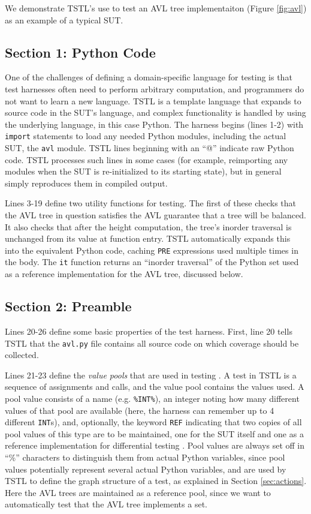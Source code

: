 \documentclass{sig-alternate}
\begin{document}
We demonstrate TSTL's use to test an AVL tree implementaiton (Figure \ref{fig:avl}) as an example of a typical SUT.


\subsection{Section 1: Python Code}

One of the challenges of defining a domain-specific language for
testing is that test harnesses often need to perform arbitrary
computation, and programmers do not want to learn a new language.
TSTL is a template language that expands to source code in the SUT's
language, and complex functionality is handled by using the underlying
language, in this case Python.  The harness begins (lines 1-2) with
{\tt import} statements to load any needed Python modules, including
the actual SUT, the {\tt avl} module.  TSTL lines beginning with an
``@'' indicate raw Python code.  TSTL processes such lines in some
cases (for example, reimporting any modules when the SUT is
re-initialized to its starting state), but in general simply
reproduces them in compiled output.  

Lines 3-19 define two utility functions for testing.  The first of
these checks that the AVL tree in question satisfies the AVL guarantee
that a tree will be balanced. It also checks that after the height
computation, the tree's inorder traversal is unchanged from its value
at function entry.  TSTL automatically expands this into the
equivalent Python code, caching {\tt PRE} expressions used multiple
times in the body.  The {\tt it} function returns an ``inorder
traversal'' of the Python set used as a reference implementation for the AVL
tree, discussed below.

\subsection{Section 2: Preamble}

Lines 20-26 define some basic properties of the test harness.  First,
line 20 tells TSTL that the {\tt avl.py} file contains all source code
on which coverage should be collected.

Lines 21-23 define the \emph{value pools} that are used in testing
\cite{AndrewsTR,UDITA}.  A test in TSTL is a sequence of assignments
and calls, and the value pool contains the values used.  A pool value
consists of a name (e.g. {\tt \%INT\%}), an integer noting how many
different values of that pool are available (here, the harness can
remember up to 4 different {\tt INT}s), and, optionally, the keyword
{\tt REF} indicating that two copies of all pool values of this type
are to be maintained, one for the SUT itself and one as a reference
implementation for differential testing \cite{Differential,ICSEDiff}.
Pool values are always set off in ``\%'' characters to distinguish
them from actual Python variables, since pool values potentially
represent several actual Python variables, and are used by TSTL to
define the graph structure of a test, as explained in Section \ref{sec:actions}.
Here the AVL trees are maintained as a reference pool, since we want
to automatically test that the AVL tree implements a set.
\end{document}
